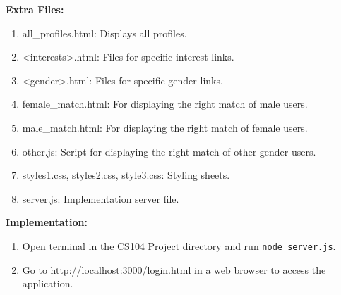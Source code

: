 \documentclass{article}
\begin{document}
\textbf{Extra Files:}

\begin{enumerate}
    \item all\_profiles.html: Displays all profiles.
    \item <interests>.html: Files for specific interest links.
    \item <gender>.html: Files for specific gender links.
    \item female_match.html: For displaying the right match of male users.
    \item male_match.html: For displaying the right match of female users.
    \item other.js: Script for displaying the right match of other gender users.
    \item styles1.css, styles2.css, style3.css: Styling sheets.
    \item server.js: Implementation server file.
\end{enumerate}

\textbf{Implementation:}

\begin{enumerate}
    \item Open terminal in the CS104 Project directory and run \texttt{node server.js}.
    \item Go to \url{http://localhost:3000/login.html} in a web browser to access the application.
\end{enumerate}
\end{document}
